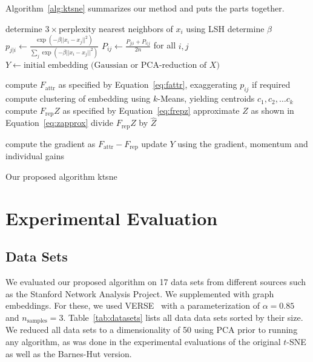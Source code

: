 Algorithm~\ref{alg:ktsne} summarizes our method and puts the parts together.

\begin{algorithm}[tb]
    \begin{algorithmic}
       
          \State determine $3 \times \text{perplexity}$ nearest neighbors of $x_i$ using LSH
          \State determine $\beta$
          \State $p_{j | i} \gets \frac{\exp(-\beta ||x_i - x_j||^2)}{\sum_{j}\exp(-\beta ||x_i - x_j||^2)}$
          \EndFor
        \EndFor
        \State $P_{ij} \gets \frac{P_{j | i} + P_{i | j}}{2n}$ for all $i, j$ 
        \State $Y \gets \text{initial embedding (Gaussian or PCA-reduction of $X$)}$

        \Repeat {}

        \State compute $F_\text{attr}$ as specified by Equation~\ref{eq:fattr}, exaggerating $p_{ij}$ if required
        \EndFor
        \\
        \State compute clustering of embedding using $k$-Means, yielding centroids $c_1, c_2, \dots c_k$
        \State compute $F_\text{rep}Z$ as specified by Equation~\ref{eq:frepz}
        \State approximate $Z$ as shown in Equation~\ref{eq:zapprox}
        \State divide $F_\text{rep}Z$ by $\hat{Z}$

        \State compute the gradient as $F_\text{attr} - F_\text{rep}$
        \State update $Y$ using the gradient, momentum and individual gains

      \EndProcedure
    \end{algorithmic}
    \caption{Our proposed algorithm ktsne}
    \label{alg:ktsne}
\end{algorithm}
\chapter{Experimental Evaluation}\label{ch:eval}

\section{Data Sets}

We evaluated our proposed algorithm on 17 data sets from different sources such
as the Stanford Network Analysis Project. We supplemented with graph embeddings. For these, we
used VERSE~\cite{verse} with a parameterization of $\alpha = 0.85$ and
$n_\text{samples} = 3$.  Table~\ref{tab:datasets} lists all data data sets
sorted by their size. We reduced all data sets to a dimensionality of 50 using
PCA prior to running any algorithm, as was done in the experimental evaluations
of the original $t$-SNE as well as the Barnes-Hut version. %

